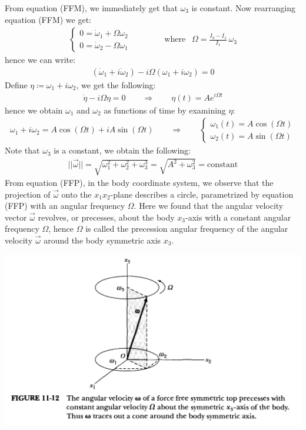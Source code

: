 \documentclass[11pt,oneside]{book}
\theoremstyle{break}
\theoremstyle{break}
\begin{document}
From equation (FFM), we immediately get that $\omega_3$ is constant. Now rearranging equation (FFM) we get:
\begin{align*}
\begin{cases}
0 = \dot{\omega}_1 +\Omega \omega_2 \\
0=\dot{\omega}_2 - \Omega \omega_1 
\end{cases}\qquad\qquad\text{where }\ \ \Omega =\frac{I_3 - I_1}{I_1}\,\omega_3 
\end{align*}
hence we can write:
\begin{align*}
(\dot{\omega}_1 + i \dot{\omega}_2 ) - i \Omega (\omega_1 + i \omega_2) = 0
\end{align*}
Define $\eta \coloneqq \omega_1 + i\omega_2$, we get the following:
\begin{align*}
\dot{\eta} - i \Omega \eta = 0 \qquad \Rightarrow \qquad \eta(t) = Ae^{i\Omega t}
\end{align*}
hence we obtain $\omega_1$ and $\omega_2$ as functions of time by examining $\eta$:
\begin{align*}
\omega_1 + i \omega_2 = A\cos(\Omega t) + iA \sin(\Omega t) \qquad \Rightarrow \qquad \begin{cases}
\omega_1 (t) = A\cos(\Omega t) \\
\omega_2(t) = A\sin(\Omega t)
\end{cases} \tag{FFP}
\end{align*}
Note that $\omega_3$ is a constant, we obtain the following:
\begin{align*}
|| \vec{\omega} || = \sqrt{ \omega_1^2 + \omega_2^2 + \omega_3^3} = \sqrt{A^2 + \omega_3^2} = \text{constant}
\end{align*}
From equation (FFP), in the body coordinate system, we observe that the projection of $\vec{\omega}$ onto the $x_1x_2$-plane describes a circle, parametrized by equation (FFP) with an angular frequency $\Omega$. Here we found that the angular velocity vector $\vec{\omega}$ revolves, or precesses, about the body $x_3$-axis with a constant angular frequency $\Omega$, hence $\Omega$ is called the precession angular frequency of the angular velocity $\vec{\omega}$ around the body symmetric axis $x_3$. \\
\begin{center}
\includegraphics[scale=0.39]{FFsymmetricTop.png}
\end{center}
\end{document}

